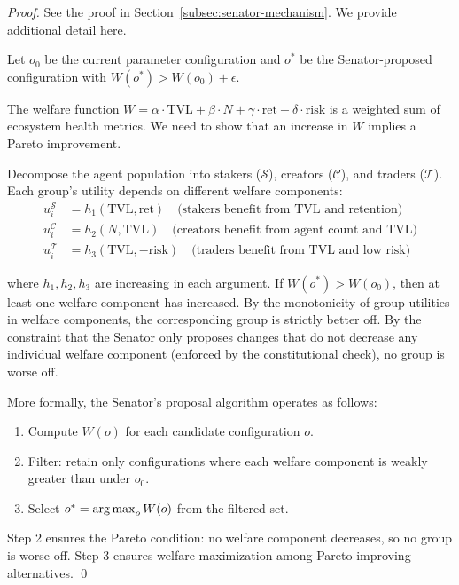 \begin{proof}
See the proof in Section~\ref{subsec:senator-mechanism}. We provide additional
detail here.

Let $o_0$ be the current parameter configuration and $o^*$ be the
Senator-proposed configuration with $W(o^*) > W(o_0) + \epsilon$.

The welfare function $W = \alpha \cdot \text{TVL} + \beta \cdot N + \gamma
\cdot \text{ret} - \delta \cdot \text{risk}$ is a weighted sum of ecosystem
health metrics. We need to show that an increase in $W$ implies a Pareto
improvement.

Decompose the agent population into stakers ($\mathcal{S}$), creators
($\mathcal{C}$), and traders ($\mathcal{T}$). Each group's utility depends
on different welfare components:
\begin{align}
  u_i^{\mathcal{S}} &= h_1(\text{TVL}, \text{ret}) \quad \text{(stakers benefit from TVL and retention)} \\
  u_i^{\mathcal{C}} &= h_2(N, \text{TVL}) \quad \text{(creators benefit from agent count and TVL)} \\
  u_i^{\mathcal{T}} &= h_3(\text{TVL}, -\text{risk}) \quad \text{(traders benefit from TVL and low risk)}
\end{align}

where $h_1, h_2, h_3$ are increasing in each argument. If $W(o^*) > W(o_0)$,
then at least one welfare component has increased. By the monotonicity of
group utilities in welfare components, the corresponding group is strictly
better off. By the constraint that the Senator only proposes changes that do
not decrease any individual welfare component (enforced by the constitutional
check), no group is worse off.

More formally, the Senator's proposal algorithm operates as follows:
\begin{enumerate}
  \item Compute $W(o)$ for each candidate configuration $o$.
  \item Filter: retain only configurations where each welfare component is
    weakly greater than under $o_0$.
  \item Select $o^* = \operatorname*{arg\,max}_o W(o)$ from the filtered set.
\end{enumerate}

Step 2 ensures the Pareto condition: no welfare component decreases, so no
group is worse off. Step 3 ensures welfare maximization among Pareto-improving
alternatives. \qed
\end{proof}

